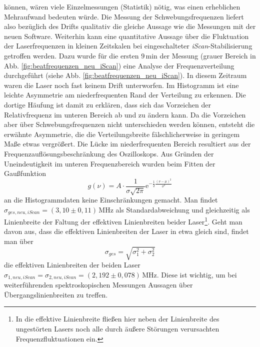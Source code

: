 können, wären viele Einzelmessungen (Statistik) nötig, was einen erheblichen
Mehraufwand bedeuten würde. Die Messung der Schwebungsfrequenzen liefert also
bezüglich des Drifts qualitativ die gleiche Aussage wie die Messungen mit der
neuen Software. Weiterhin kann eine quantitative Aussage über die Fluktuation
der Laserfrequenzen in kleinen Zeitskalen bei eingeschalteter
\textit{iScan}-Stabilisierung getroffen werden. Dazu wurde für die ersten
$9\,$min der Messung (grauer Bereich in Abb.
\ref{fig:beatfrequenzen_neu_iScan})
eine Analyse der Frequenzverteilung durchgeführt (siehe Abb.
\ref{fig:beatfrequenzen_neu_iScan}).
In diesem Zeitraum waren die Laser noch fast keinem Drift unterworfen. Im
Histogramm ist eine leichte Asymmetrie am niederfrequenten Rand der Verteilung
zu erkennen. Die dortige Häufung ist damit zu erklären, dass sich das Vorzeichen
der Relativfrequenz im unteren Bereich ab und zu ändern kann. Da die Vorzeichen
aber über Schwebungsfrequenzen nicht unterschieden werden können, entsteht die erwähnte
Asymmetrie, die die Verteilungsbreite fälschlicherweise in geringem Maße etwas
vergrößert. Die Lücke im niederfrequenten Bereich resultiert aus der
Frequenzauflösungsbeschränkung des Oszilloskops. Aus Gründen der Uneindeutigkeit
im unteren Frequenzbereich wurden beim Fitten der Gaußfunktion
\begin{equation}\label{eq:schwebungsfrequenzen_gauss}
	g(\nu)=A\cdot\frac{1}{\sigma\sqrt{2\pi}}\mathrm{e}^{-\frac{1}{2}\frac{(\nu-\mu)^2}{\sigma^2}}
\end{equation}
an die Histogrammdaten keine Einschränkungen gemacht. Man findet
$\sigma_{ges,neu,iScan}=(3,10\pm0,11)\,$MHz als Standardabweichung und
gleichzeitig als Linienbreite der Faltung der effektiven Linienbreiten beider
Laser\footnote{In die effektive Linienbreite fließen hier neben der Linienbreite
des ungestörten Lasers noch alle durch äußere Störungen verursachten
Frequenzfluktuationen ein.}. Geht man davon aus, dass die effektiven
Linienbreiten der Laser in etwa gleich sind, findet man über
\begin{equation}\label{eq:schwebungsfrequenzen_linienbreite}
	\sigma_{ges}=\sqrt{\sigma_1^2+\sigma_2^2}
\end{equation}
die effektiven Linienbreiten der beiden Laser
$\sigma_{1,neu,iScan}=\sigma_{2,neu,iScan}=(2,192\pm0,078)\,$MHz. Diese ist
wichtig, um bei weiterführenden spektroskopischen Messungen Aussagen über
Übergangslinienbreiten zu treffen.\par
